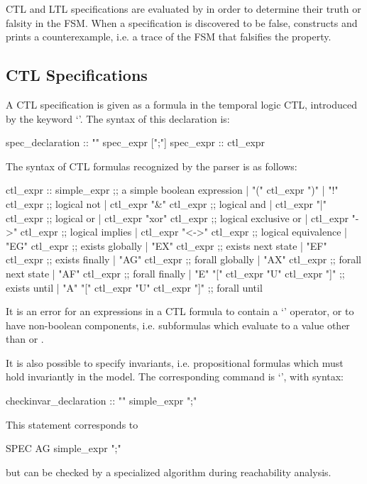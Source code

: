CTL and LTL specifications are evaluated by \nusmv in order to
determine their truth or falsity in the FSM. When a specification is
discovered to be false, \nusmv constructs and prints a counterexample,
i.e. a trace of the FSM that falsifies the property.

\subsection{CTL Specifications}
\label{CTL Specifications}
%
A CTL specification is given as a formula in the temporal logic CTL,
introduced by the keyword `'. The syntax of this
declaration is:
%
\begin{Grammar}
spec_declaration :: "" spec_expr [";"]
spec_expr        :: ctl_expr
\end{Grammar}
%
The syntax of CTL formulas recognized by the \nusmv parser is
as follows:
%
\begin{Grammar}
ctl_expr ::
    simple_expr                 ;; a simple boolean expression
    | "(" ctl_expr ")"
    | "!" ctl_expr              ;; logical not
    | ctl_expr "&" ctl_expr     ;; logical and
    | ctl_expr "|" ctl_expr     ;; logical or
    | ctl_expr "xor" ctl_expr   ;; logical exclusive or
    | ctl_expr "->" ctl_expr    ;; logical implies
    | ctl_expr "<->" ctl_expr   ;; logical equivalence
    | "EG" ctl_expr             ;; exists globally
    | "EX" ctl_expr             ;; exists next state
    | "EF" ctl_expr             ;; exists finally
    | "AG" ctl_expr             ;; forall globally
    | "AX" ctl_expr             ;; forall next state
    | "AF" ctl_expr             ;; forall finally
    | "E" "[" ctl_expr "U" ctl_expr "]" ;; exists until
    | "A" "[" ctl_expr "U" ctl_expr "]" ;; forall until
\end{Grammar}
%
It is an error for an expressions in a CTL formula to contain a
`' operator, or to have non-boolean components, i.e.
subformulas which evaluate to a value other than  or .

It is also possible to specify invariants, i.e. propositional formulas
which must hold invariantly in the model. The corresponding command is
`', with syntax:
%
\begin{Grammar}
checkinvar_declaration :: "" simple_expr ";"
\end{Grammar}
%
This statement corresponds to
%
\begin{Grammar}
SPEC  AG simple_expr ";"
\end{Grammar}
%
but can be checked by a specialized algorithm during reachability
analysis.

